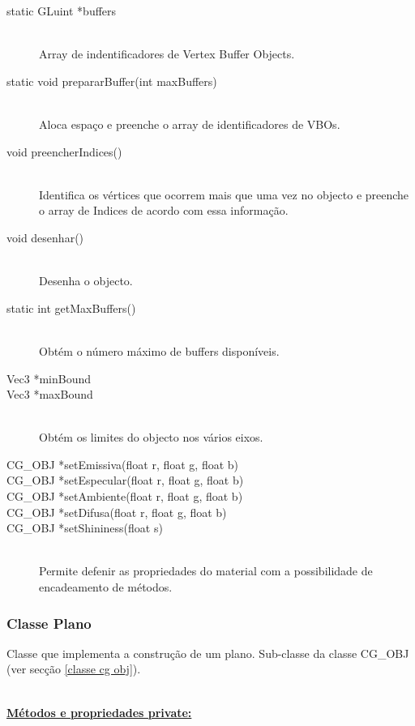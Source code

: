 \documentclass[a5paper,onecolumn, 11pt]{article}
\begin{document}
\begin{description}
	\item[static GLuint *buffers] \hfill \\
	Array de indentificadores de Vertex Buffer Objects.

	\item[static void prepararBuffer(int maxBuffers)] \hfill \\
	Aloca espaço e preenche o array de identificadores de VBOs.

	\item[void preencherIndices()] \hfill \\
	Identifica os vértices que ocorrem mais que uma vez no objecto e preenche o array de Indices de acordo com essa informação.

	\item[void desenhar()] \hfill \\
	Desenha o objecto.

	\item[static int getMaxBuffers()] \hfill \\
	Obtém o número máximo de buffers disponíveis.

	\item[Vec3 *minBound]
	\item[Vec3 *maxBound] \hfill \\
	Obtém os limites do objecto nos vários eixos.

	\item[CG\_OBJ *setEmissiva(float r, float g, float b)]
	\item[CG\_OBJ *setEspecular(float r, float g, float b)]
	\item[CG\_OBJ *setAmbiente(float r, float g, float b)]
	\item[CG\_OBJ *setDifusa(float r, float g, float b)]
	\item[CG\_OBJ *setShininess(float s)] \hfill \\
	Permite defenir as propriedades do material com a possibilidade de encadeamento de métodos.
\end{description}

\clearpage
\subsubsection{Classe Plano} \label{classe plano}
Classe que implementa a construção de um plano. Sub-classe da classe CG\_OBJ (ver secção \ref{classe cg obj}).

\hfill \\ \underline{\textbf{Métodos e propriedades private:}}
\end{document}
